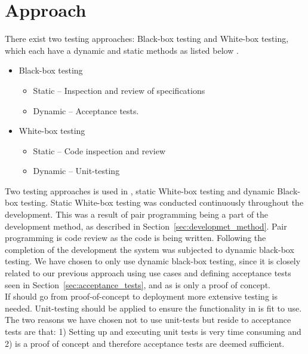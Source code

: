 \section{Approach}
\label{sec:testing_approach}
There exist two testing approaches: Black-box testing and White-box testing, which each have a dynamic and static methods as listed below \citep{Patton06}.

\begin{itemize}
	\item Black-box testing
		\begin{itemize}
			\item Static -- Inspection and review of specifications
			\item Dynamic -- Acceptance tests.
		\end{itemize}

	\item White-box testing
		\begin{itemize}
			\item Static -- Code inspection and review
			\item Dynamic -- Unit-testing
		\end{itemize}
\end{itemize}

Two testing approaches is used in \projectname{}, static White-box testing and dynamic Black-box testing.
Static White-box testing was conducted continuously throughout the development.
This was a result of pair programming being a part of the development method, as described in Section~\ref{sec:developmet_method}.
Pair programming is code review as the code is being written\citep{Patton06}.
Following the completion of the development the system was subjected to dynamic black-box testing.
We have chosen to only use dynamic black-box testing, since it is closely related to our previous approach using use cases and defining acceptance tests seen in Section~\ref{sec:acceptance_tests}, and as \projectname{} is only a proof of concept.\\

If \projectname{} should go from proof-of-concept to deployment more extensive testing is needed.
Unit-testing should be applied to ensure the functionality in \projectname{} is fit to use.
The two reasons we have chosen not to use unit-tests but reside to acceptance tests are that: 1) Setting up and executing unit tests is very time consuming and 2) \projectname{} is a proof of concept and therefore acceptance tests are deemed sufficient.\\


